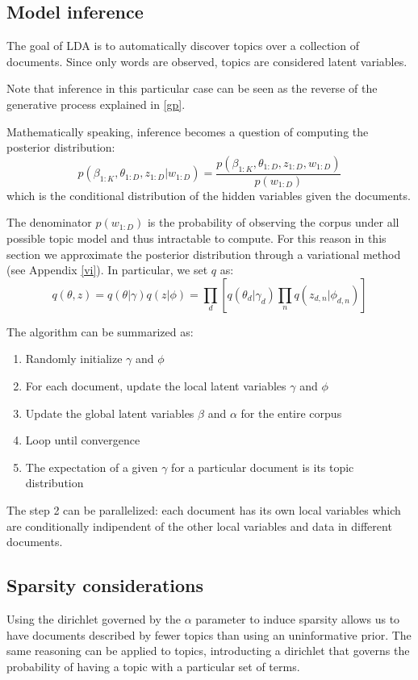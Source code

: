 \subsection{Model inference}
The goal of LDA is to automatically discover topics over a collection of documents.
Since only words are observed, topics are considered latent variables.

Note that inference in this particular case can be seen as the reverse of the generative process explained in \ref{gp}.

Mathematically speaking, inference becomes a question of computing the posterior distribution:
$$ p(\beta_{1:K}, \theta_{1:D}, z_{1:D} | w_{1:D}) = \frac{p(\beta_{1:K}, \theta_{1:D}, z_{1:D}, w_{1:D})}{p(w_{1:D})}$$
which is the conditional distribution of the hidden variables given the documents.

The denominator $p(w_{1:D})$ is the probability of observing the corpus under all possible topic model
and thus intractable to compute.
For this reason in this section we approximate the posterior distribution through a variational method
(see Appendix \ref{vi}).
In particular, we set $q$ as:
$$ q(\theta, z) = q(\theta | \gamma) q(z | \phi) = \prod_d [q(\theta_d | \gamma_d) \prod_n q(z_{d,n} | \phi_{d,n})]$$

The algorithm can be summarized as:
\begin{enumerate}
    \item Randomly initialize $\gamma$ and $\phi$
    \item For each document, update the local latent variables $\gamma$ and $\phi$
    \item Update the global latent variables $\beta$ and $\alpha$ for the entire corpus
    \item Loop until convergence
    \item The expectation of a given $\gamma$ for a particular document is its topic distribution
\end{enumerate}

The step 2 can be parallelized: each document has its own local variables which are conditionally indipendent 
of the other local variables and data in different documents. 

\subsection{Sparsity considerations}
Using the dirichlet governed by the $\alpha$ parameter to induce sparsity  
allows us to have documents described by fewer topics than using an uninformative prior. 
The same reasoning can be applied to topics, introducting a dirichlet that governs the 
probability of having a topic with a particular set of terms. 

